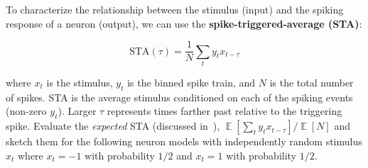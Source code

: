 \documentclass[letterpaper,11pt]{exam}
\DeclareMathOperator*{\E}{\mathbb{E}} %
\newcommand{\funfact}{\textbf{Fun Fact:}~}
\begin{document}
\begin{questions}
\question To characterize the relationship between the stimulus (input) and the spiking response of a neuron (output), we can use the \textbf{spike-triggered-average (STA)}:
\begin{tcolorbox}[colback=red!5!white,colframe=red!50!black]
\noindent
\begin{equation}\label{eq:sta}
    \text{STA}(\tau) = \frac{1}{N} \sum_t y_{t} x_{t-\tau}
\end{equation}
\end{tcolorbox}
where $x_t$ is the stimulus, $y_t$ is the binned spike train, and $N$ is the total number of spikes.
STA is the average stimulus conditioned on each of the spiking events (non-zero $y_t$).
Larger $\tau$ represents times farther past relative to the triggering spike.
Evaluate the \emph{expected} STA (discussed in~\citet{Dayan2001}), $\E[\sum_t y_{t} x_{t-\tau}]/\E[N]$ and sketch them for the following neuron models with independently random stimulus $x_t$ where $x_t = -1$ with probability $1/2$ and $x_t = 1$ with probability $1/2$.


\end{questions}
\end{document}
